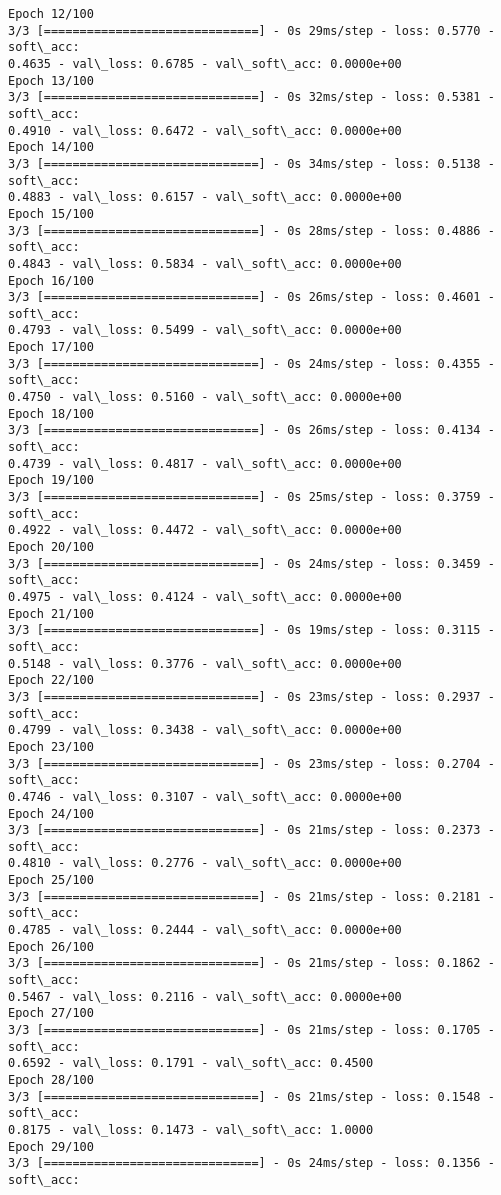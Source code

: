\documentclass[11pt]{article}
\begin{document}
\begin{Verbatim}[commandchars=\\\{\}]
Epoch 12/100
3/3 [==============================] - 0s 29ms/step - loss: 0.5770 - soft\_acc:
0.4635 - val\_loss: 0.6785 - val\_soft\_acc: 0.0000e+00
Epoch 13/100
3/3 [==============================] - 0s 32ms/step - loss: 0.5381 - soft\_acc:
0.4910 - val\_loss: 0.6472 - val\_soft\_acc: 0.0000e+00
Epoch 14/100
3/3 [==============================] - 0s 34ms/step - loss: 0.5138 - soft\_acc:
0.4883 - val\_loss: 0.6157 - val\_soft\_acc: 0.0000e+00
Epoch 15/100
3/3 [==============================] - 0s 28ms/step - loss: 0.4886 - soft\_acc:
0.4843 - val\_loss: 0.5834 - val\_soft\_acc: 0.0000e+00
Epoch 16/100
3/3 [==============================] - 0s 26ms/step - loss: 0.4601 - soft\_acc:
0.4793 - val\_loss: 0.5499 - val\_soft\_acc: 0.0000e+00
Epoch 17/100
3/3 [==============================] - 0s 24ms/step - loss: 0.4355 - soft\_acc:
0.4750 - val\_loss: 0.5160 - val\_soft\_acc: 0.0000e+00
Epoch 18/100
3/3 [==============================] - 0s 26ms/step - loss: 0.4134 - soft\_acc:
0.4739 - val\_loss: 0.4817 - val\_soft\_acc: 0.0000e+00
Epoch 19/100
3/3 [==============================] - 0s 25ms/step - loss: 0.3759 - soft\_acc:
0.4922 - val\_loss: 0.4472 - val\_soft\_acc: 0.0000e+00
Epoch 20/100
3/3 [==============================] - 0s 24ms/step - loss: 0.3459 - soft\_acc:
0.4975 - val\_loss: 0.4124 - val\_soft\_acc: 0.0000e+00
Epoch 21/100
3/3 [==============================] - 0s 19ms/step - loss: 0.3115 - soft\_acc:
0.5148 - val\_loss: 0.3776 - val\_soft\_acc: 0.0000e+00
Epoch 22/100
3/3 [==============================] - 0s 23ms/step - loss: 0.2937 - soft\_acc:
0.4799 - val\_loss: 0.3438 - val\_soft\_acc: 0.0000e+00
Epoch 23/100
3/3 [==============================] - 0s 23ms/step - loss: 0.2704 - soft\_acc:
0.4746 - val\_loss: 0.3107 - val\_soft\_acc: 0.0000e+00
Epoch 24/100
3/3 [==============================] - 0s 21ms/step - loss: 0.2373 - soft\_acc:
0.4810 - val\_loss: 0.2776 - val\_soft\_acc: 0.0000e+00
Epoch 25/100
3/3 [==============================] - 0s 21ms/step - loss: 0.2181 - soft\_acc:
0.4785 - val\_loss: 0.2444 - val\_soft\_acc: 0.0000e+00
Epoch 26/100
3/3 [==============================] - 0s 21ms/step - loss: 0.1862 - soft\_acc:
0.5467 - val\_loss: 0.2116 - val\_soft\_acc: 0.0000e+00
Epoch 27/100
3/3 [==============================] - 0s 21ms/step - loss: 0.1705 - soft\_acc:
0.6592 - val\_loss: 0.1791 - val\_soft\_acc: 0.4500
Epoch 28/100
3/3 [==============================] - 0s 21ms/step - loss: 0.1548 - soft\_acc:
0.8175 - val\_loss: 0.1473 - val\_soft\_acc: 1.0000
Epoch 29/100
3/3 [==============================] - 0s 24ms/step - loss: 0.1356 - soft\_acc:

\end{Verbatim}
\end{document}
